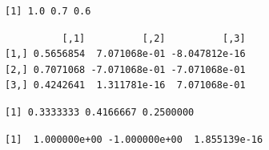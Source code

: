 \documentclass[
  letterpaper,
  DIV=11,
  numbers=noendperiod]{scrreprt}
\newenvironment{Shaded}{\begin{snugshade}}{\end{snugshade}}
\newcommand{\DecValTok}[1]{\textcolor[rgb]{0.68,0.00,0.00}{#1}}
\newcommand{\FunctionTok}[1]{\textcolor[rgb]{0.28,0.35,0.67}{#1}}
\newcommand{\NormalTok}[1]{\textcolor[rgb]{0.00,0.23,0.31}{#1}}
\newcommand{\OtherTok}[1]{\textcolor[rgb]{0.00,0.23,0.31}{#1}}
\newcommand{\SpecialCharTok}[1]{\textcolor[rgb]{0.37,0.37,0.37}{#1}}
\begin{document}
\begin{verbatim}
[1] 1.0 0.7 0.6
\end{verbatim}

\begin{Shaded}
\end{Shaded}

\begin{verbatim}
          [,1]          [,2]          [,3]
[1,] 0.5656854  7.071068e-01 -8.047812e-16
[2,] 0.7071068 -7.071068e-01 -7.071068e-01
[3,] 0.4242641  1.311781e-16  7.071068e-01
\end{verbatim}

\begin{Shaded}
\end{Shaded}

\begin{verbatim}
[1] 0.3333333 0.4166667 0.2500000
\end{verbatim}

\begin{Shaded}
\end{Shaded}

\begin{verbatim}
[1]  1.000000e+00 -1.000000e+00  1.855139e-16
\end{verbatim}

\begin{Shaded}
\end{Shaded}
\end{document}
